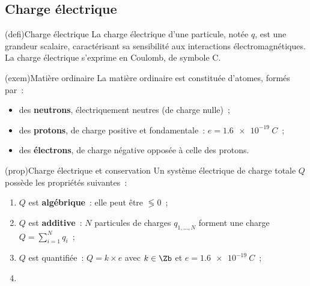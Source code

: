 \documentclass[../../main/main.tex]{subfiles}
\begin{document}
\subsection{Charge électrique}

\begin{tcb}[label=def:q, sidebyside](defi){Charge électrique}
	La charge électrique d'une particule, notée $q$, est une grandeur
	scalaire, caractérisant sa sensibilité aux interactions
	électromagnétiques.
	\tcblower
	La charge électrique s'exprime en Coulomb, de symbole C.
\end{tcb}
\begin{tcb}[label=exem:q](exem){Matière ordinaire}
	La matière ordinaire est constituée d'atomes, formés par~:
	\begin{itemize}
		\item des \textbf{neutrons}, électriquement neutres (de charge nulle)~;
		\item des \textbf{protons}, de charge positive et fondamentale~: $e =
			      \SI{1.6e-19}{C}$~;
		\item des \textbf{électrons}, de charge négative opposée à celle des
		      protons.
	\end{itemize}
\end{tcb}
\begin{tcb}[label=prop:q](prop){Charge électrique et conservation}
	Un système électrique de charge totale $Q$ possède les propriétés
	suivantes~:
	\begin{enumerate}
		\item $Q$ est \textbf{algébrique}~: elle peut être $\lessgtr 0$~;
		\item $Q$ est \textbf{additive}~: $N$ particules de charges $q_{1, …,
					      N}$ forment une charge $Q = \sum_{i=1}^{N} q_i$~;
		\item $Q$ est quantifiée~: $Q = k\times e$ avec $k \in \Zb$ et $e =
			      \SI{1.6e-19}{C}$~;
		\item {}
	\end{enumerate}
\end{tcb}
\end{document}
